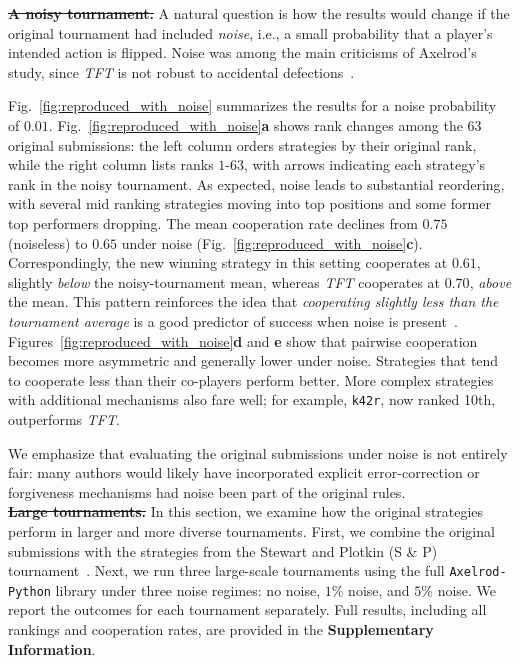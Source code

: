 \documentclass{article}
\newcommand{\TFT}{\emph{TFT}}
\newcommand{\AXL}{\texttt{Axelrod-Python}}
\newcommand{\SI}{\textbf{Supplementary Information}}
\providecommand{\DIFdeltex}[1]{{\protect\color{red}\sout{#1}}}                      %
\providecommand{\DIFdelbegin}{} %
\providecommand{\DIFdelend}{} %
\providecommand{\DIFdel}[1]{\texorpdfstring{\DIFdeltex{#1}}{}} %
\newcommand{\DIFscaledelfig}{0.5}
\newlength{\DIFdelgraphicswidth} %
\newlength{\DIFdelgraphicsheight} %
\newcommand{\DIFdelincludegraphics}[2][]{%
\sbox{\DIFdelgraphicsbox}{\DIFOincludegraphics[#1]{#2}}%
\settoboxwidth{\DIFdelgraphicswidth}{\DIFdelgraphicsbox} %
\settoboxtotalheight{\DIFdelgraphicsheight}{\DIFdelgraphicsbox} %
\scalebox{\DIFscaledelfig}{%
\parbox[b]{\DIFdelgraphicswidth}{\usebox{\DIFdelgraphicsbox}\\[-\baselineskip] \rule{\DIFdelgraphicswidth}{0em}}\llap{\resizebox{\DIFdelgraphicswidth}{\DIFdelgraphicsheight}{%
\setlength{\unitlength}{\DIFdelgraphicswidth}%
\begin{picture}(1,1)%
\thicklines\linethickness{2pt} %
{\color[rgb]{1,0,0}\put(0,0){\framebox(1,1){}}}%
{\color[rgb]{1,0,0}\put(0,0){\line( 1,1){1}}}%
{\color[rgb]{1,0,0}\put(0,1){\line(1,-1){1}}}%
\end{picture}%
}\hspace*{3pt}}} %
} %
\DeclareRobustCommand{\DIFdelbegin}{\DIFOdelbegin \let\includegraphics\DIFdelincludegraphics} %
\DeclareRobustCommand{\DIFdelend}{\DIFOaddend \let\includegraphics\DIFOincludegraphics} %
\begin{document}
\DIFdelbegin %
\textbf{\DIFdel{A noisy tournament.}}
\DIFdelend A natural question is how the results would change if the original tournament
had included \emph{noise}, i.e., a small probability that a player's intended
action is flipped. Noise was among the main criticisms of Axelrod's study, since
\TFT{} is not robust to accidental defections~\cite{molander1985optimal,
bendor1993uncertainty, wu1995cope, do2017combination}.

Fig.~\ref{fig:reproduced_with_noise} summarizes the results for a noise probability of
\(0.01\). Fig.~\ref{fig:reproduced_with_noise}\textbf{a} shows rank changes among the 63 original
submissions: the left column orders strategies by their original rank, while
the right column lists ranks \(1\)-\(63\), with arrows indicating each strategy's
rank in the noisy tournament. As expected, noise leads to substantial reordering,
with several mid ranking strategies moving into top positions and some former top performers
dropping. The mean cooperation rate declines from \(0.75\) (noiseless) to \(0.65\)
under noise (Fig.~\ref{fig:reproduced_with_noise}\textbf{c}). Correspondingly, the new
winning strategy in this setting cooperates at \(0.61\), slightly \emph{below} the
noisy-tournament mean, whereas \TFT{} cooperates at \(0.70\), \emph{above} the mean.
This pattern reinforces the idea that \emph{cooperating slightly less than the
tournament average} is a good predictor of success when noise is present~\cite{glynatsi2024properties}.
Figures~\ref{fig:reproduced_with_noise}\textbf{d} and \textbf{e} show that pairwise cooperation
becomes more asymmetric and generally lower under noise. Strategies that tend to
cooperate less than their co-players perform better. More complex strategies with
additional mechanisms also fare well; for example, \texttt{k42r}, now ranked 10th,
outperforms \TFT{}.

We emphasize that evaluating the original submissions under noise is not
entirely fair: many authors would likely have incorporated explicit
error-correction or forgiveness mechanisms had noise been part of the original
rules.\\

\DIFdelbegin %
\textbf{\DIFdel{Large tournaments.}}
\DIFdelend In this section, we examine how the original strategies perform in larger and more
diverse tournaments. First, we combine the original submissions with the strategies
from the Stewart and Plotkin (S \& P) tournament~\cite{Stewart2012}. Next, we run
three large-scale tournaments using the full \AXL{} library under three noise
regimes: no noise, \(1\%\) noise, and \(5\%\) noise. We report the outcomes for
each tournament separately. Full results, including all rankings and cooperation
rates, are provided in the \SI.
\end{document}

